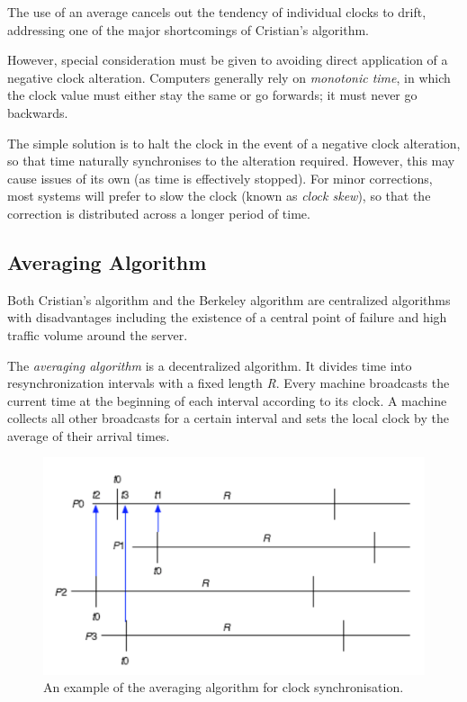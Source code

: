 The use of an average cancels out the tendency of individual clocks to drift, addressing one of the major shortcomings of Cristian's algorithm.

However, special consideration must be given to avoiding direct application of a negative clock alteration. Computers generally rely on \textit{monotonic time}, in which the clock value must either stay the same or go forwards; it must never go backwards.

The simple solution is to halt the clock in the event of a negative clock alteration, so that time naturally synchronises to the alteration required. However, this may cause issues of its own (as time is effectively stopped). For minor corrections, most systems will prefer to slow the clock (known as \textit{clock skew}), so that the correction is distributed across a longer period of time.

\subsection{Averaging Algorithm}
Both Cristian's algorithm and the Berkeley algorithm are centralized algorithms with disadvantages including the existence of a central point of failure and high traffic volume around the server.

The \textit{averaging algorithm} is a decentralized algorithm. It divides time into resynchronization intervals with a fixed length \textit{R}. Every machine broadcasts the current time at the beginning of each interval according to its clock. A machine collects all other broadcasts for a certain interval and sets the local clock by the average of their arrival times. 

\begin{figure}
\centering
\includegraphics[width=0.7\linewidth]{screenshot030}
\caption{An example of the averaging algorithm for clock synchronisation.}
\label{fig:screenshot030}
\end{figure}

